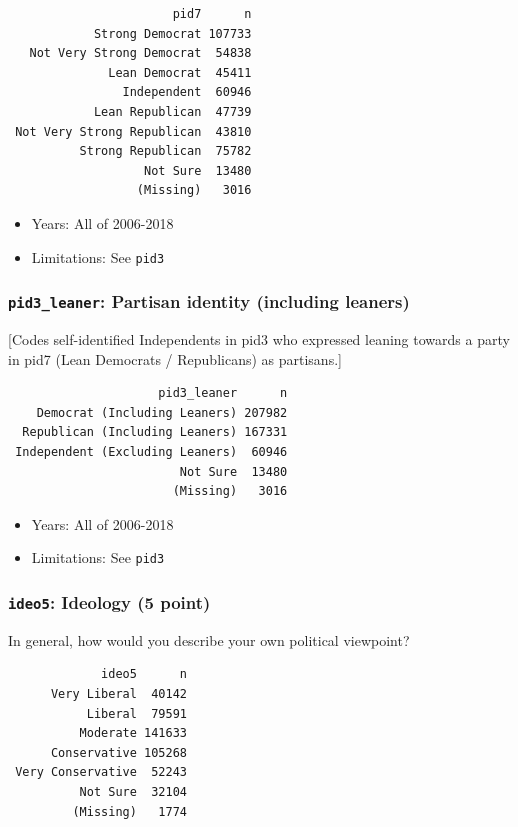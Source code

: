 \documentclass[10pt,article,oneside]{memoir}
\theoremstyle{definition}
\begin{document}
\begin{verbatim}
                       pid7      n
            Strong Democrat 107733
   Not Very Strong Democrat  54838
              Lean Democrat  45411
                Independent  60946
            Lean Republican  47739
 Not Very Strong Republican  43810
          Strong Republican  75782
                   Not Sure  13480
                  (Missing)   3016
\end{verbatim}

\begin{itemize}
\tightlist
\item
  Years: All of 2006-2018
\item
  Limitations: See \texttt{pid3}
\end{itemize}

\subsubsection{\texorpdfstring{\texttt{pid3\_leaner}: Partisan identity
(including
leaners)}{pid3\_leaner: Partisan identity (including leaners)}}\label{pid3_leaner-partisan-identity-including-leaners}

{[}Codes self-identified Independents in pid3 who expressed leaning
towards a party in pid7 (Lean Democrats / Republicans) as partisans.{]}

\begin{verbatim}
                     pid3_leaner      n
    Democrat (Including Leaners) 207982
  Republican (Including Leaners) 167331
 Independent (Excluding Leaners)  60946
                        Not Sure  13480
                       (Missing)   3016
\end{verbatim}

\begin{itemize}
\tightlist
\item
  Years: All of 2006-2018
\item
  Limitations: See \texttt{pid3}
\end{itemize}

\subsubsection{\texorpdfstring{\texttt{ideo5}: Ideology (5
point)}{ideo5: Ideology (5 point)}}\label{ideo5-ideology-5-point}

In general, how would you describe your own political viewpoint?

\begin{verbatim}
             ideo5      n
      Very Liberal  40142
           Liberal  79591
          Moderate 141633
      Conservative 105268
 Very Conservative  52243
          Not Sure  32104
         (Missing)   1774
\end{verbatim}
\end{document}
